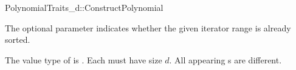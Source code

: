 \begin{ccRefConcept}{PolynomialTraits_d::ConstructPolynomial}
{        The optional parameter  indicates whether the given iterator range is 
        already sorted.  

        \ccPrecond The value type of  is
        .    
        \ccPrecond Each  must have size $d$.
        \ccPrecond All appearing s are different.  
       
        }


\ccSeeAlso

\\

\end{ccRefConcept}
